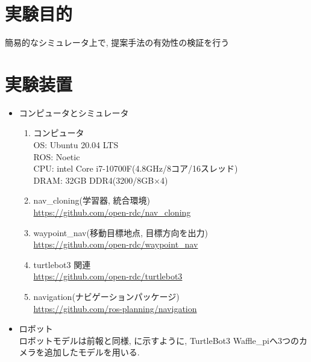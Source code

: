 

  \section{実験目的}
  簡易的なシミュレータ上で, 提案手法の有効性の検証を行う
  \section{実験装置}
  \begin{itemize}
    
    \item コンピュータとシミュレータ
    \begin{enumerate}
      \item コンピュータ\\
      OS: Ubuntu 20.04 LTS\\
      ROS: Noetic\\
      CPU: intel Core i7-10700F(4.8GHz/8コア/16スレッド)\\
      DRAM: 32GB DDR4(3200/8GB×4)
      \item nav\_cloning(学習器, 統合環境)\\
      \url{https://github.com/open-rdc/nav_cloning}
      \item waypoint\_nav(移動目標地点, 目標方向を出力)\\
      \url{https://github.com/open-rdc/waypoint_nav}
      \newpage
      \item turtlebot3 関連\\
      \url{https://github.com/open-rdc/turtlebot3}
      \item navigation(ナビゲーションパッケージ)\\
      \url{https://github.com/ros-planning/navigation}
    \end{enumerate}

    \item ロボット\\
    ロボットモデルは前報\cite{okada1}\cite{okada2}と同様, に示すように, TurtleBot3 Waffle\_pi\cite{turtlebot3}へ3つのカメラを追加したモデルを用いる.


\end{itemize}
